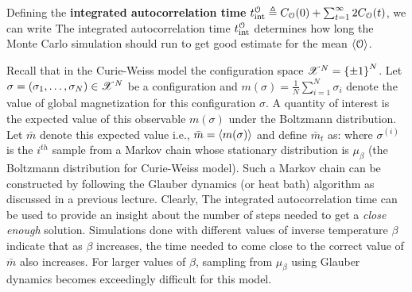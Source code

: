\documentclass[letterpaper,english,10pt]{article}
\begin{document}
Defining the \textbf{integrated autocorrelation time} $t^{\mathcal{O}}_{\text{int}} \triangleq C_{\mathcal{O}}(0) + \sum_{t=1}^\infty 2C_{\mathcal{O}}(t)$, we can write 
The integrated autocorrelation time $t^{\mathcal{O}}_{\text{int}}$ determines how long the Monte Carlo simulation should run to get good estimate for the mean $\left\langle\mathcal{O}\right\rangle$. 
\begin{shaded*}
\begin{exmp}
Recall that in the Curie-Weiss model the configuration space $\mathscr{X}^N = \left\{\pm 1\right\}^N$. Let $\sigma = (\sigma_1, \dots, \sigma_N) \in \mathscr{X}^N$ be a configuration and $m(\sigma) = \frac{1}{N}\sum_{i=1}^N \sigma_i$ denote the value of global magnetization for this configuration $\sigma$. A quantity of interest is the expected value of this observable $m(\sigma)$ under the Boltzmann distribution. Let $\bar{m}$ denote this expected value i.e., $\bar{m} = \left\langle m(\sigma)\right\rangle$ and define $\bar{m}_t$ as:
where $\sigma^{(i)}$ is the $i^{th}$ sample from a Markov chain whose stationary distribution is $\mu_\beta$ (the Boltzmann distribution for Curie-Weiss model). Such a Markov chain can be constructed by following the Glauber dynamics (or heat bath) algorithm as discussed in a previous lecture. Clearly,
The integrated autocorrelation time can be used to provide an insight about the number of steps needed to get a \textit{close enough} solution. Simulations done with different values of inverse temperature $\beta$ indicate that as $\beta$ increases, the time needed to come close to the correct value of $\bar{m}$ also increases. For larger values of $\beta$, sampling from $\mu_\beta$ using Glauber dynamics becomes exceedingly difficult for this model. 
\end{exmp}
\end{shaded*}
\end{document}
